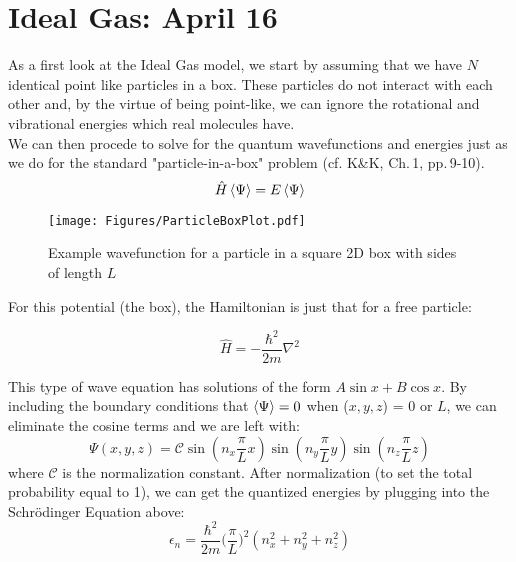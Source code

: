\section{Ideal Gas: April 16}
As a first look at the Ideal Gas model, we start by assuming that we have $N$ identical point like particles in a box. These particles do not interact with each other and, by the virtue of being point-like, we can ignore the rotational and vibrational energies which real molecules have.\\

We can then procede to solve for the quantum wavefunctions and energies just as we do for the standard "particle-in-a-box" problem (cf. K\&K, Ch.\,1, pp.\,9-10).
\begin{equation}
\hat{H} \Braket{\Psi} = E \Braket{\Psi}
\end{equation}

\begin{figure}[h]
\centering
\texttt{[image: Figures/ParticleBoxPlot.pdf]}
\caption{Example wavefunction for a particle in a square 2D box 
	with sides of length $L$}
\end{figure}

For this potential (the box), the Hamiltonian is just that for a free 
particle:

\begin{equation}
\hat{H} = -\frac{\hbar^2}{2 m} \nabla^2
\end{equation}

This type of wave equation has solutions of the form $A \sin{x} + B \cos{x}$.
By including the boundary conditions that $\Braket{\Psi} = 0$ when
($x, y, z$) = $0$ or $L$, we can eliminate the cosine terms and we are left
with:
\begin{equation}
\Psi(x,y,z) = \mathcal{C} \sin(n_x \frac{\pi}{L} x) \sin(n_y \frac{\pi}{L} y) \sin(n_z \frac{\pi}{L} z)
\end{equation}
where $\mathcal{C}$ is the normalization constant. After normalization (to set the total probability equal to 1), we can get the quantized energies by plugging into the Schr\"odinger Equation above:
\begin{equation}
\epsilon_n = \frac{\hbar^2}{2 m}\bigg(\frac{\pi}{L} \bigg)^2 (n_x^2 + n_y^2 + n_z^2)
\label{eq:IdealGasEnergies}
\end{equation}


